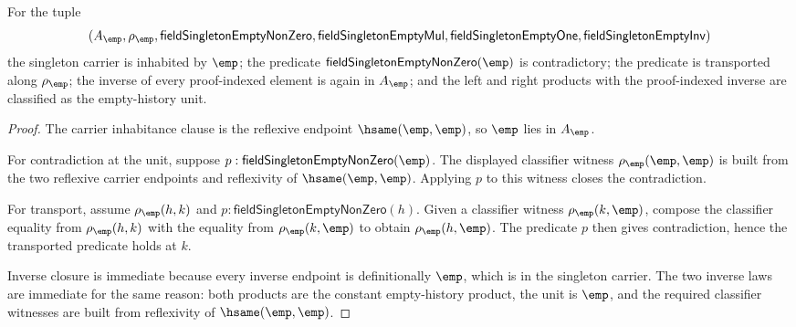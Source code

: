 \begin{theorem}
\label{thm:field-singleton-empty-schema-laws}
For the tuple
$$
(A_{\emp},\rho_{\emp},\mathsf{fieldSingletonEmptyNonZero},
\mathsf{fieldSingletonEmptyMul},\mathsf{fieldSingletonEmptyOne},
\mathsf{fieldSingletonEmptyInv})
$$
the singleton carrier is inhabited by $\emp$; the predicate
$\mathsf{fieldSingletonEmptyNonZero}(\emp)$ is contradictory; the predicate is
transported along $\rho_{\emp}$; the inverse of every proof-indexed element is
again in $A_{\emp}$; and the left and right products with the proof-indexed
inverse are classified as the empty-history unit.
\end{theorem}
\begin{proof}
The carrier inhabitance clause is the reflexive endpoint
$\hsame(\emp,\emp)$, so $\emp$ lies in $A_{\emp}$.

For contradiction at the unit, suppose
$p:\mathsf{fieldSingletonEmptyNonZero}(\emp)$. The displayed classifier
witness $\rho_{\emp}(\emp,\emp)$ is built from the two reflexive carrier
endpoints and reflexivity of $\hsame(\emp,\emp)$. Applying $p$ to this witness
closes the contradiction.

For transport, assume $\rho_{\emp}(h,k)$ and
$p:\mathsf{fieldSingletonEmptyNonZero}(h)$. Given a classifier witness
$\rho_{\emp}(k,\emp)$, compose the classifier equality from
$\rho_{\emp}(h,k)$ with the equality from $\rho_{\emp}(k,\emp)$ to obtain
$\rho_{\emp}(h,\emp)$. The predicate $p$ then gives contradiction, hence the
transported predicate holds at $k$.

Inverse closure is immediate because every inverse endpoint is definitionally
$\emp$, which is in the singleton carrier. The two inverse laws are immediate
for the same reason: both products are the constant empty-history product, the
unit is $\emp$, and the required classifier witnesses are built from
reflexivity of $\hsame(\emp,\emp)$.
\end{proof}
